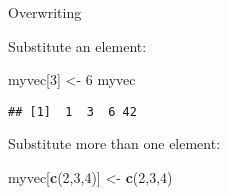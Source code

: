 \documentclass[ignorenonframetext,]{beamer}
\newenvironment{Shaded}{\begin{snugshade}}{\end{snugshade}}
\newcommand{\DecValTok}[1]{\textcolor[rgb]{0.00,0.00,0.81}{#1}}
\newcommand{\KeywordTok}[1]{\textcolor[rgb]{0.13,0.29,0.53}{\textbf{#1}}}
\newcommand{\NormalTok}[1]{#1}
\newcommand{\StringTok}[1]{\textcolor[rgb]{0.31,0.60,0.02}{#1}}
\begin{document}
\begin{frame}[fragile]{Overwriting}
\protect\hypertarget{overwriting}{}

Substitute an element:

\begin{Shaded}
\begin{Highlighting}[]
\NormalTok{myvec[}\DecValTok{3}\NormalTok{] <-}\StringTok{ }\DecValTok{6}
\NormalTok{myvec}
\end{Highlighting}
\end{Shaded}

\begin{verbatim}
## [1]  1  3  6 42
\end{verbatim}

Substitute more than one element:

\begin{Shaded}
\begin{Highlighting}[]
\NormalTok{myvec[}\KeywordTok{c}\NormalTok{(}\DecValTok{2}\NormalTok{,}\DecValTok{3}\NormalTok{,}\DecValTok{4}\NormalTok{)] <-}\StringTok{ }\KeywordTok{c}\NormalTok{(}\DecValTok{2}\NormalTok{,}\DecValTok{3}\NormalTok{,}\DecValTok{4}\NormalTok{)}
\end{Highlighting}
\end{Shaded}

\end{frame}
\end{document}
